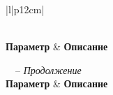     \begin{longtable}{|l|p{12cm}|}
        \caption{Подробное описание параметров солнечной и геомагнитной активности}
        \label{tab:detailed_solar_geo_params} \\
        
        \hline
        \textbf{Параметр} & \textbf{Описание} \\
        \hline
        \endfirsthead
        
        {\tablename\ \thetable\ -- \textit{Продолжение}} \\
        \hline
        \textbf{Параметр} & \textbf{Описание} \\
        \hline
        \endhead
        
        \hline
         \\
        \hline
        \endfoot
        
        \hline
        \endlastfoot


\end{longtable}
